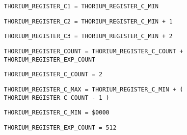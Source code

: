\begin{verbatim}
THORIUM_REGISTER_C1 = THORIUM_REGISTER_C_MIN
\end{verbatim}
\label{thoriumcore:thorium:thoriumregisterc1}



\begin{verbatim}
THORIUM_REGISTER_C2 = THORIUM_REGISTER_C_MIN + 1
\end{verbatim}
\label{thoriumcore:thorium:thoriumregisterc2}



\begin{verbatim}
THORIUM_REGISTER_C3 = THORIUM_REGISTER_C_MIN + 2
\end{verbatim}
\label{thoriumcore:thorium:thoriumregisterc3}



\begin{verbatim}
THORIUM_REGISTER_COUNT = THORIUM_REGISTER_C_COUNT + THORIUM_REGISTER_EXP_COUNT
\end{verbatim}
\label{thoriumcore:thorium:thoriumregistercount}



\begin{verbatim}
THORIUM_REGISTER_C_COUNT = 2
\end{verbatim}
\label{thoriumcore:thorium:thoriumregisterccount}



\begin{verbatim}
THORIUM_REGISTER_C_MAX = THORIUM_REGISTER_C_MIN + ( THORIUM_REGISTER_C_COUNT - 1 )
\end{verbatim}
\label{thoriumcore:thorium:thoriumregistercmax}



\begin{verbatim}
THORIUM_REGISTER_C_MIN = $0000
\end{verbatim}
\label{thoriumcore:thorium:thoriumregistercmin}



\begin{verbatim}
THORIUM_REGISTER_EXP_COUNT = 512
\end{verbatim}
\label{thoriumcore:thorium:thoriumregisterexpcount}



